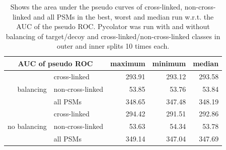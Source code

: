 \begin{table}[htbp]
	\normalsize
	\centering	
	\caption[Area under the pseudo ROC curves with and without balancing of classes]{Shows the area under the pseudo curves of cross-linked, non-cross-linked and all PSMs in the best, worst and median run w.r.t. the AUC of the pseudo ROC. Pycolator was run with and without balancing of target/decoy and cross-linked/non-cross-linked classes in outer and inner splits 10 times each.}
	\begin{tabular}{r|l||rrr}
		\multicolumn{2}{c}{AUC of pseudo ROC} & maximum & minimum & median \\
		\hline
		\multirow{3}[0]{*}{balancing} & cross-linked & 293.91 & 293.12 & 293.58 \\
		& non-cross-linked & 53.85 & 53.76 & 53.84 \\
		& all PSMs & 348.65 & 347.48 & 348.19 \\
		\hline
		\multirow{3}[0]{*}{no balancing} & cross-linked & 294.42 & 291.51 & 292.86 \\
		& non-cross-linked & 53.63 & 54.34 & 53.78 \\
		& all PSMs & 349.14 & 347.04 & 347.69 \\
	\end{tabular}
	\label{tab:results:maxminmedian}
\end{table}
\renewcommand{\baselinestretch}{1}

